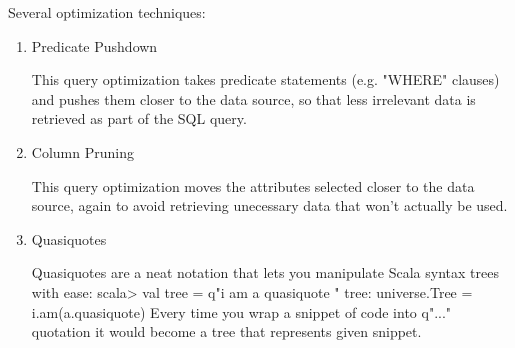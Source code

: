 \documentclass[twoside]{article}
\begin{document}
Several optimization techniques:

\begin{enumerate}

\item Predicate Pushdown

This query optimization takes predicate statements (e.g. "WHERE" clauses) and pushes them closer to the data source, so that less irrelevant data is retrieved as part of the SQL query.

\item Column Pruning

This query optimization moves the attributes selected closer to the data source, again to avoid retrieving unecessary data that won't actually be used.

\item Quasiquotes

Quasiquotes are a neat notation that lets you manipulate Scala syntax trees with ease:
scala> val tree = q"i am a quasiquote "
tree: universe.Tree = i.am(a.quasiquote)
Every time you wrap a snippet of code into q"..." quotation it would become a tree that represents given
snippet.


\end{enumerate}





\end{document}
